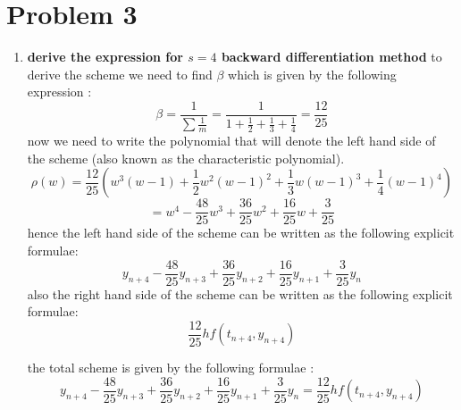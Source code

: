 \documentclass[12pt,letterpaper]{article}
\begin{document}
\section*{Problem 3}


\begin{enumerate}
  \item
  \textbf{derive the expression for $s=4$ backward differentiation method}
  \newline
  \newline
   to derive the scheme we need to find $\beta$ which is given by the following expression : 
   \[\beta = \frac{1}{\sum \frac{1}{m}} = \frac{1}{1+\frac{1}{2}+\frac{1}{3}+\frac{1}{4}} = \frac{12}{25}\]
  now we need to write the polynomial that will denote the left hand side of the scheme (also known as the characteristic polynomial).
  \[\rho(w) = \frac{12}{25} \left( w^3(w-1) + \frac{1}{2} w^2 (w-1)^2 + \frac{1}{3} w (w-1)^3 + \frac{1}{4} (w-1)^4\right)    \]
  \[ = w^4 - \frac{48}{25} w^3 + \frac{36}{25}w^2+ \frac{16}{25} w +\frac{3}{25}\]
  hence the left hand side of the scheme can be written as the following explicit formulae: 
  \[  y_{n+4} - \frac{48}{25} y_{n+3} + \frac{36}{25}y_{n+2}+ \frac{16}{25} y_{n+1} +\frac{3}{25} y_{n}\]
  also the right hand side of the scheme can be written as the following explicit formulae: 
  \[\frac{12}{25} h f(t_{n+4}, y_{n+4})\]
  
  the total scheme is given by the following formulae : 
   \[  y_{n+4} - \frac{48}{25} y_{n+3} + \frac{36}{25}y_{n+2}+ \frac{16}{25} y_{n+1} +\frac{3}{25} y_{n} = \frac{12}{25} h f(t_{n+4}, y_{n+4})\]
\end{enumerate}
\end{document}
